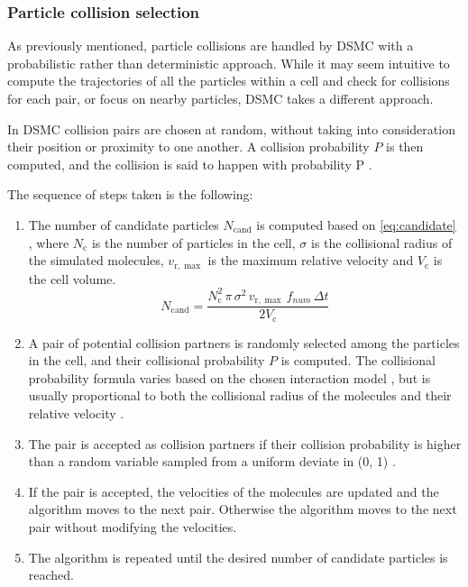 \subsubsection{Particle collision selection}
\label{subsection:collision}
As previously mentioned, particle collisions are handled by DSMC with a probabilistic rather than deterministic approach. While it may seem intuitive to compute the trajectories of all the particles within a cell and check for collisions for each pair, or focus on nearby particles, DSMC takes a different approach.

In DSMC collision pairs are chosen at random, without taking into consideration their position or proximity to one another. A collision probability $P$ is then computed, and the collision is said to happen with probability P \cite{bird, themontecarlo, natodsmc}.

The sequence of steps taken is the following:
\begin{enumerate}
    \item The number of candidate particles $N_{\mathrm{cand}}$ is computed based on \autoref{eq:candidate} \cite{themontecarlo}, where $N_{\mathrm{c}}$ is the number of particles in the cell, $\sigma$ is the collisional radius of the simulated molecules, $v_{\mathrm{r}, \max }$ is the maximum relative velocity and $V_{\mathrm{c}}$ is the cell volume.
    \begin{equation}
        N_{\mathrm{cand}}=\frac{N_{\mathrm{c}}^2\, \pi\, \sigma^2\, v_{\mathrm{r}, \max }\, f_{num}\, \Delta t}{2 V_{\mathrm{c}}}
        \label{eq:candidate}
    \end{equation}
    \item A pair of potential collision partners is randomly selected among the particles in the cell, and their collisional probability $P$ is computed. The collisional probability formula varies based on the chosen interaction model \cite{natodsmc}, but is usually proportional to both the collisional radius of the molecules and their relative velocity \cite{bird}.
    \item The pair is accepted as collision partners if their collision probability is higher than a random variable sampled from a uniform deviate in (0, 1) \cite{themontecarlo}.
    \item If the pair is accepted, the velocities of the molecules are updated and the algorithm moves to the next pair. Otherwise the algorithm moves to the next pair without modifying the velocities.
    \item The algorithm is repeated until the desired number of candidate particles is reached.
\end{enumerate}

